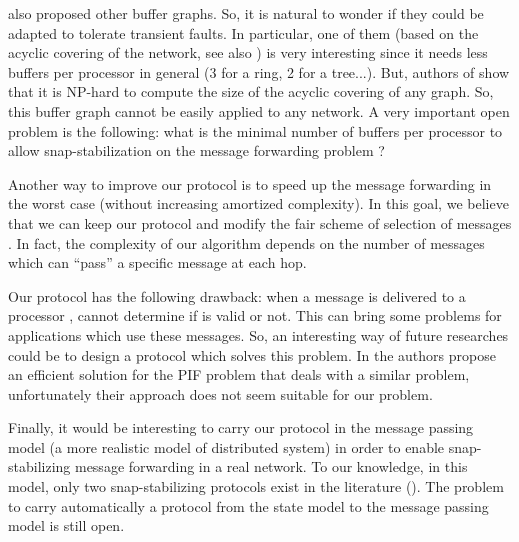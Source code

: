 \documentclass[11pt]{article}
\begin{document}
\cite{MS78} also proposed other buffer graphs. So, it is natural to wonder if they could be adapted to tolerate transient faults. In particular, one of them (based on the acyclic covering of the network, see also \cite{T01}) is very interesting since it needs less buffers per processor in general (3 for a ring, 2 for a tree...). But, authors of \cite{KR07} show that it is NP-hard to compute the size of the acyclic covering of any graph. So, this buffer graph cannot be easily applied to any network. A very important open problem is the following: what is the minimal number of buffers per processor to allow snap-stabilization on the message forwarding problem ?

Another way to improve our protocol is to speed up the message forwarding in the worst case (without increasing amortized complexity). In this goal, we believe that we can keep our protocol and modify the fair scheme of selection of messages . In fact, the complexity of our algorithm depends on the number of messages which can ``pass'' a specific message at each hop.

Our protocol has the following drawback: when a message  is delivered to a processor ,  cannot determine if  is valid or not. This can bring some problems for applications which use these messages. So, an interesting way of future researches could be to design a protocol which solves this problem. In \cite{CDV06} the authors propose an efficient solution for the PIF problem that deals with a similar problem, unfortunately their approach does not seem suitable for our problem.

Finally, it would be interesting to carry our protocol in the message passing model (a more realistic model of distributed system) in order to enable snap-stabilizing message forwarding in a real network. To our knowledge, in this model, only two snap-stabilizing protocols exist in the literature (\cite{DDNT08,DT06}). The problem to carry automatically a protocol from the state model to the message passing model is still open. 



\newpage



\end{document}
